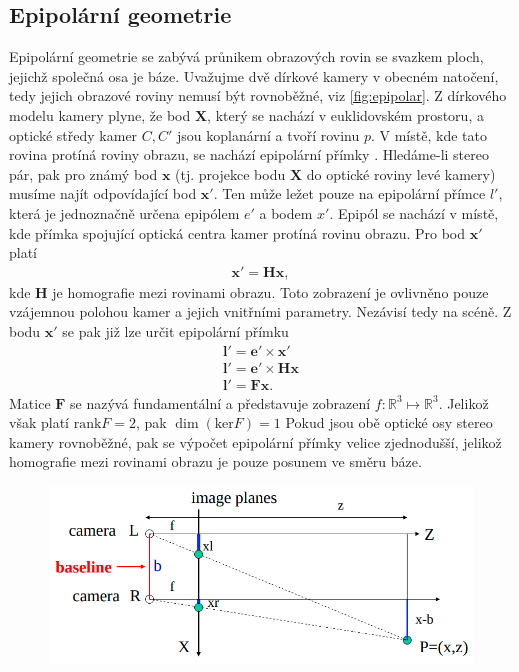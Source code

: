 \documentclass[twoside]{ctuthesis}
\newcommand{\tl}[1]{$\mathbf{#1}$}
\begin{document}
\subsection{Epipolární geometrie}
\label{Sec:epipolar}
Epipolární geometrie se zabývá průnikem obrazových rovin se svazkem ploch, jejichž společná osa je báze. Uvažujme dvě dírkové kamery v obecném natočení, tedy jejich obrazové roviny nemusí být rovnoběžné, viz \ref{fig:epipolar}. Z dírkového modelu kamery plyne, že bod \tl{X}, který se nachází v euklidovském prostoru, a optické středy kamer $C, C'$ jsou koplanární a tvoří rovinu $p$. V místě, kde tato rovina protíná roviny obrazu, se nachází epipolární přímky . Hledáme-li stereo pár, pak pro známý bod \tl{x} (tj. projekce bodu \tl{X} do optické roviny levé kamery) musíme najít odpovídající bod \tl{x'}. Ten může ležet pouze na epipolární přímce $l'$, která je jednoznačně určena epipólem $e'$ a bodem $x'$. Epipól se nachází v místě, kde přímka spojující optická centra kamer protíná rovinu obrazu. Pro bod \tl{x'} platí
\begin{align}
    \mathbf{x'} = \mathbf{Hx},
\end{align}
kde \tl{H} je homografie mezi rovinami obrazu. Toto zobrazení je ovlivněno pouze vzájemnou polohou kamer a jejich vnitřními parametry. Nezávisí tedy na scéně.
Z bodu \tl{x'} se pak již lze určit epipolární přímku 
\begin{align}
    \mathbf{l'} = \mathbf{e'} \times \mathbf{x'} \\
    \mathbf{l'} = \mathbf{e'} \times \mathbf{Hx} \\
    \mathbf{l'} = \mathbf{Fx}.
\end{align}    
Matice \tl{F} se nazývá fundamentální a představuje zobrazení $f:\mathbb{R}^3 \mapsto \mathbb{R}^3$. Jelikož však platí $\text{rank} F = 2$, pak $\dim (\text{ker} F) = 1$
    Pokud jsou obě optické osy stereo kamery rovnoběžné, pak se výpočet epipolární přímky velice zjednodušší, jelikož homografie mezi rovinami obrazu je pouze posunem ve směru báze.
\begin{figure}

    \centering
    \includegraphics[width = 0.8\linewidth]{pictures/stereo_sketch.png}
    \caption{\cite{washingtion_steropic}}
    \label{stereo_paralel}
\end{figure}
\end{document}
